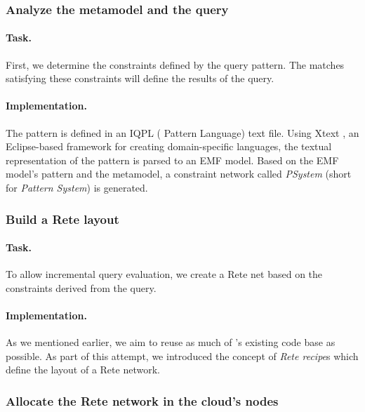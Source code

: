 
\subsubsection{Analyze the metamodel and the query}

\paragraph{Task.} First, we determine the constraints defined by the query pattern. The matches satisfying these constraints will define the results of the query.

\paragraph{Implementation.} The pattern is defined in an IQPL (\iq{} Pattern Language) text file. Using Xtext \cite{Xtext}, an Eclipse-based framework for creating domain-specific languages, the textual representation of the pattern is parsed to an EMF model. Based on the EMF model's pattern and the metamodel, a constraint network called \textit{PSystem} (short for \textit{Pattern System}) is generated. 

\subsubsection{Build a Rete layout}

\paragraph{Task.} To allow incremental query evaluation, we create a Rete net based on the constraints derived from the query.

\paragraph{Implementation.} As we mentioned earlier, we aim to reuse as much of \eiq{}'s existing code base as possible. As part of this attempt, we introduced the concept of \textit{Rete recipe}s which define the layout of a Rete network.    

\subsubsection{Allocate the Rete network in the cloud's nodes} 

